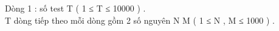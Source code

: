 Dòng 1 : số test T ( 1 ≤ T ≤ 10000 ) .   
\\   T dòng tiếp theo mỗi dòng gồm 2 số nguyên N M ( 1 ≤ N , M ≤ 1000 ) .  

\
